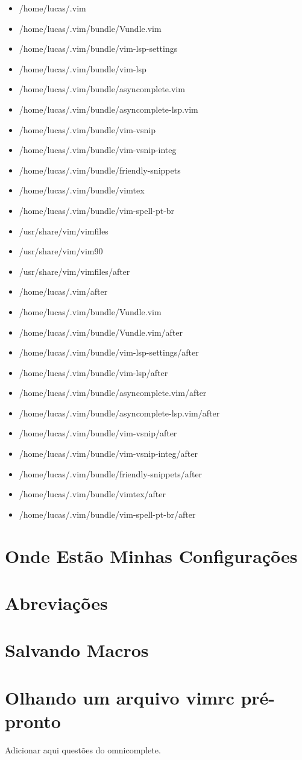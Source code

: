 \begin{itemize}
	\item /home/lucas/.vim
	\item /home/lucas/.vim/bundle/Vundle.vim
	\item /home/lucas/.vim/bundle/vim-lsp-settings
	\item /home/lucas/.vim/bundle/vim-lsp
	\item /home/lucas/.vim/bundle/asyncomplete.vim
	\item /home/lucas/.vim/bundle/asyncomplete-lsp.vim
	\item /home/lucas/.vim/bundle/vim-vsnip
	\item /home/lucas/.vim/bundle/vim-vsnip-integ
	\item /home/lucas/.vim/bundle/friendly-snippets
	\item /home/lucas/.vim/bundle/vimtex
	\item /home/lucas/.vim/bundle/vim-spell-pt-br
	\item /usr/share/vim/vimfiles
	\item /usr/share/vim/vim90
	\item /usr/share/vim/vimfiles/after
	\item /home/lucas/.vim/after
	\item /home/lucas/.vim/bundle/Vundle.vim
	\item /home/lucas/.vim/bundle/Vundle.vim/after
	\item /home/lucas/.vim/bundle/vim-lsp-settings/after
	\item /home/lucas/.vim/bundle/vim-lsp/after
	\item /home/lucas/.vim/bundle/asyncomplete.vim/after
	\item /home/lucas/.vim/bundle/asyncomplete-lsp.vim/after
	\item /home/lucas/.vim/bundle/vim-vsnip/after
	\item /home/lucas/.vim/bundle/vim-vsnip-integ/after
	\item /home/lucas/.vim/bundle/friendly-snippets/after
	\item /home/lucas/.vim/bundle/vimtex/after
	\item /home/lucas/.vim/bundle/vim-spell-pt-br/after
\end{itemize}


\section{Onde Estão Minhas Configurações}
\section{Abreviações}
\section{Salvando Macros}
\section{Olhando um arquivo vimrc pré-pronto}
Adicionar aqui questões do omnicomplete.
\newpage

